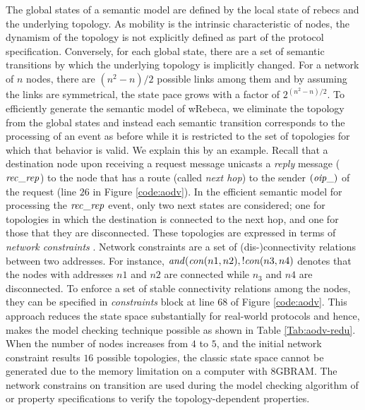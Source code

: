 The global states of a semantic model are defined by the local state of rebecs and the underlying topology. As mobility is the intrinsic characteristic of nodes, the dynamism of the topology is not explicitly defined as part of the protocol specification. Conversely, for each global state, there are a set of semantic transitions by which the underlying topology is implicitly changed.  For a network of $n$ nodes, there are $(n^2-n)/2$ possible links among them and by assuming the links are symmetrical, the state pace grows with a factor of $2^{(n^2-n)/2}$. To efficiently generate the semantic model of wRebeca, %
we eliminate the topology from the global states and instead %
each semantic transition corresponds to the processing of an event as before while it is restricted to the set of topologies for which that behavior is valid.  We explain this by an example. Recall that a destination node upon receiving a request message unicasts a \emph{reply} message (${\it rec\_rep}$) to the node that has a route (called \emph{next hop}) to the sender $({\it oip\_})$ of the request (line $26$ in Figure \ref{code:aodv}). In the efficient semantic model for processing the ${\it rec\_rep}$ event, only two next states are considered; one for topologies in which the destination is connected to the next hop, and one for those that they are disconnected. These topologies are expressed in terms of \emph{network constraints} \cite{FatemehFI10,FatemehFI19}. Network constraints are a set of (dis-)connectivity relations between two addresses. For instance, ${\it and}({\it con}(n1,n2),!{\it con}(n3,n4)$ denotes that the nodes with addresses $n1$ and $n2$ are connected while $n_3$ and $n4$ are disconnected. To enforce a set of stable connectivity relations among the nodes, they can be specified in \emph{constraints} block at line $68$ of Figure \ref{code:aodv}. This approach reduces the state space substantially for real-world protocols and hence, makes the model checking technique possible as shown in Table \ref{Tab:aodv-redu}. When the number of nodes increases from $4$ to $5$, and the initial network constraint results $16$ possible topologies, the classic state space cannot be generated due to the memory limitation on a computer with 8GBRAM. The network constrains on transition are used during the model checking algorithm of \cite{FORM} or property specifications \cite{CSI2018} to verify the topology-dependent properties. 


